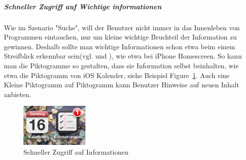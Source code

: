 

\subparagraph{Schneller Zugriff auf Wichtige informationen} 
\label{subp:subparagraph_name}

Wie im Szenario "Suche", will der Benutzer nicht immer in das Innenleben von Programmen eintauchen, nur um kleine wichtige Bruchteil der Information zu gewinnen. Deshalb sollte man wichtige Informationen schon etwa beim einem Streifblick erkennbar sein(vgl. \cite[Seite 54]{mobileFrontier} und \cite{Neil:2012uf}),  wie etwa bei iPhone Homescreen. So kann man die Piktogramme so gestalten, dass sie Information selbst beinhalten, wie etwa die Piktogramm von iOS Kalender, siehe Beispiel Figure~\ref{fig:iconIos}. Auch eine Kleine Piktogramm auf Piktogramm kann Benutzer Hinweise auf neuen Inhalt anbieten.

\begin{figure}
	\begin{center}
	
	\includegraphics[width=0.3\textwidth]{img/iconIos.png}
	\caption{Schneller Zugriff auf Informationen}\label{fig:iconIos}
\end{center}
\end{figure}


